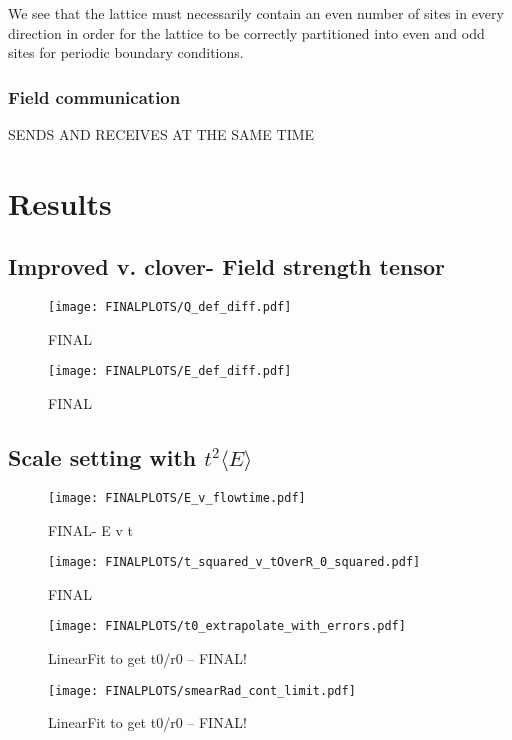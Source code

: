 \documentclass[a4paper,10pt]{article}
\begin{document}
We see that the lattice must necessarily contain an even number of sites in every direction in order for the lattice to be correctly partitioned into even and odd sites for periodic boundary conditions.

\subsubsection{Field communication}
SENDS AND RECEIVES AT THE SAME TIME

\section{Results}

\subsection{Improved v. clover- Field strength tensor}
\begin{figure}[H]
\centering
\texttt{[image: FINALPLOTS/Q\_def\_diff.pdf]}
\caption[]{FINAL}\label{fig:PLACEHOLDER}
\end{figure}
\begin{figure}[H]
\centering
\texttt{[image: FINALPLOTS/E\_def\_diff.pdf]}
\caption[]{FINAL}\label{fig:PLACEHOLDER}
\end{figure}
\subsection{Scale setting with $t^2\langle E\rangle$}
\begin{figure}[H]
\centering
\texttt{[image: FINALPLOTS/E\_v\_flowtime.pdf]}
\caption[]{FINAL- E v t}\label{fig:PLACEHOLDER}
\end{figure}

\begin{figure}[H]
\centering
\texttt{[image: FINALPLOTS/t\_squared\_v\_tOverR\_0\_squared.pdf]}
\caption[]{FINAL}\label{fig:PLACEHOLDER}
\end{figure}

\begin{figure}[H]
\centering
\texttt{[image: FINALPLOTS/t0\_extrapolate\_with\_errors.pdf]}
\caption[]{LinearFit to get t0/r0 -- FINAL!}\label{fig:PLACEHOLDER}
\end{figure}

\begin{figure}[H]
\centering
\texttt{[image: FINALPLOTS/smearRad\_cont\_limit.pdf]}
\caption[]{LinearFit to get t0/r0 -- FINAL!}\label{fig:PLACEHOLDER}
\end{figure}
\end{document}
